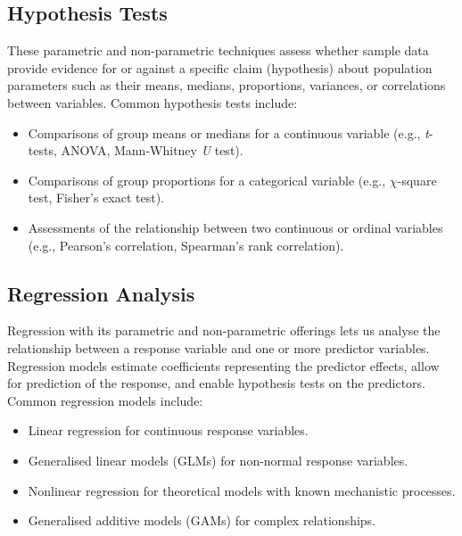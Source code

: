\documentclass[
  letterpaper,
]{book}
\providecommand{\tightlist}{%
  \setlength{\itemsep}{0pt}\setlength{\parskip}{0pt}}\usepackage{longtable,booktabs,array}
\begin{document}
\subsection{Hypothesis Tests}\label{hypothesis-tests}

These parametric and non-parametric techniques assess whether sample
data provide evidence for or against a specific claim (hypothesis) about
population parameters such as their means, medians, proportions,
variances, or correlations between variables. Common hypothesis tests
include:

\begin{itemize}
\tightlist
\item
  Comparisons of group means or medians for a continuous variable (e.g.,
  \emph{t}-tests, ANOVA, Mann-Whitney \emph{U} test).
\item
  Comparisons of group proportions for a categorical variable (e.g.,
  \(\chi\)-square test, Fisher's exact test).
\item
  Assessments of the relationship between two continuous or ordinal
  variables (e.g., Pearson's correlation, Spearman's rank correlation).
\end{itemize}

\subsection{Regression Analysis}\label{regression-analysis}

Regression with its parametric and non-parametric offerings lets us
analyse the relationship between a response variable and one or more
predictor variables. Regression models estimate coefficients
representing the predictor effects, allow for prediction of the
response, and enable hypothesis tests on the predictors. Common
regression models include:

\begin{itemize}
\tightlist
\item
  Linear regression for continuous response variables.
\item
  Generalised linear models (GLMs) for non-normal response variables.
\item
  Nonlinear regression for theoretical models with known mechanistic
  processes.
\item
  Generalised additive models (GAMs) for complex relationships.
\end{itemize}
\end{document}
